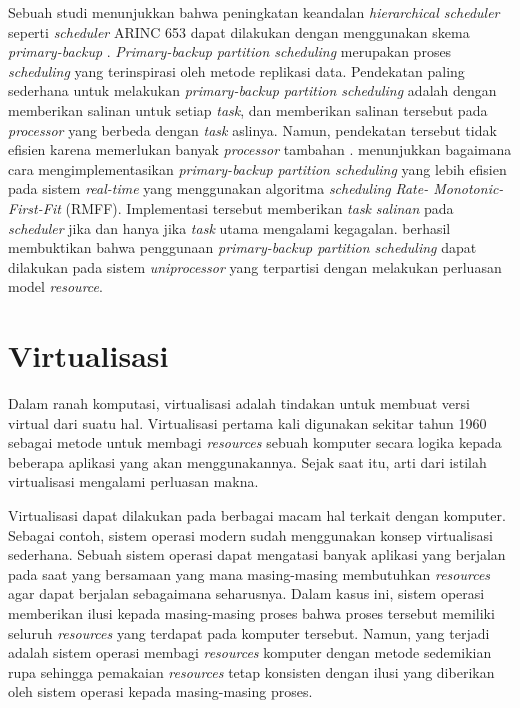 Sebuah studi menunjukkan bahwa peningkatan keandalan \textit{hierarchical scheduler} seperti
\textit{scheduler} ARINC 653 dapat dilakukan dengan menggunakan skema \textit{primary-backup}
\citep{Hyun2012}. \textit{Primary-backup partition scheduling} merupakan proses
\textit{scheduling} yang terinspirasi oleh metode replikasi data. Pendekatan paling sederhana
untuk melakukan \textit{primary-backup partition scheduling} adalah dengan memberikan salinan untuk setiap
\textit{task}, dan memberikan salinan tersebut pada \textit{processor} yang berbeda dengan
\textit{task} aslinya.  Namun, pendekatan tersebut tidak efisien karena memerlukan banyak
\textit{processor} tambahan \citep{Oh1994}.  \citet{Bertossi2006} menunjukkan bagaimana cara
mengimplementasikan \textit{primary-backup partition scheduling} yang lebih efisien pada sistem
\textit{real-time} yang menggunakan algoritma \textit{scheduling} \textit{Rate-
Monotonic-First-Fit} (RMFF).  Implementasi tersebut memberikan \textit{task} \textit{salinan}
pada \textit{scheduler} jika dan hanya jika \textit{task} utama mengalami kegagalan.
\citet{Jin2013} berhasil membuktikan bahwa penggunaan \textit{primary-backup partition scheduling} dapat
dilakukan pada sistem \textit{uniprocessor} yang terpartisi dengan melakukan perluasan model
\textit{resource}.

\section{Virtualisasi}

Dalam ranah komputasi, virtualisasi adalah tindakan untuk membuat versi virtual dari suatu hal.
Virtualisasi pertama kali digunakan sekitar tahun 1960 sebagai metode untuk membagi
\textit{resources} sebuah komputer secara logika kepada beberapa aplikasi yang akan
menggunakannya.  Sejak saat itu, arti dari istilah virtualisasi mengalami perluasan makna.

Virtualisasi dapat dilakukan pada berbagai macam hal terkait dengan komputer.  Sebagai contoh,
sistem operasi modern sudah menggunakan konsep virtualisasi sederhana.  Sebuah sistem operasi
dapat mengatasi banyak aplikasi yang berjalan pada saat yang bersamaan yang mana masing-masing
membutuhkan \textit{resources} agar dapat berjalan sebagaimana seharusnya.  Dalam kasus ini,
sistem operasi memberikan ilusi kepada masing-masing proses bahwa proses tersebut memiliki
seluruh \textit{resources} yang terdapat pada komputer tersebut.  Namun, yang terjadi adalah
sistem operasi membagi \textit{resources} komputer dengan metode sedemikian rupa sehingga
pemakaian \textit{resources} tetap konsisten dengan ilusi yang diberikan oleh sistem operasi
kepada masing-masing proses.

